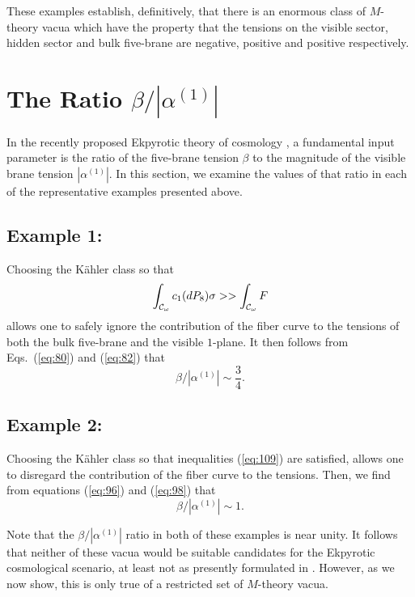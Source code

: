 \documentclass[a4paper,12pt]{article}
\numberwithin{equation}{section}
\theoremstyle{plain}
\begin{document}
These examples establish, definitively, that there is an enormous class of
$M$-theory vacua which have the property that the tensions on the visible
sector, hidden sector and bulk five-brane are negative, positive and positive
respectively.

\section{The Ratio $\beta/|\alpha^{(1)}|$}

In the recently proposed Ekpyrotic theory of cosmology 
\cite{EU}, a fundamental input
parameter is the ratio of the five-brane tension $\beta$ to the magnitude of
the visible brane tension $|\alpha^{(1)}|$. In this section, we examine the
values of that ratio in each of the representative examples presented above.

\subsection*{Example 1:}

Choosing the K\"{a}hler class so that 
%
\begin{equation}
\int_{{\cal{C}}_{\omega}}{c_{1}(dP_{8})\sigma} >>\int_{{\cal{C}}_{\omega}}{F}
\label{eq:125}
\end{equation}
%
allows one to safely ignore the contribution of the fiber curve to the
tensions of both the bulk five-brane and the visible $1$-plane. It then
follows from Eqs.~(\ref{eq:80}) and (\ref{eq:82}) that
%
\begin{equation}
\beta/|\alpha^{(1)}|\sim \frac{3}{4}.
\label{eq:126}
\end{equation}
%


\subsection*{Example 2:}

Choosing the K\"{a}hler class so that inequalities (\ref{eq:109}) are satisfied,
allows one to disregard the contribution of the fiber curve to the
tensions. Then, we find from equations (\ref{eq:96}) and (\ref{eq:98}) that
%
\begin{equation}
\beta/|\alpha^{(1)}|\sim 1.
\label{eq:128}
\end{equation}
%

Note that the $\beta/|\alpha^{(1)}|$ ratio in both of these examples is near
unity. It follows that neither of these vacua would be suitable candidates for
the Ekpyrotic cosmological scenario, at least not as presently formulated
in \cite{EU}. However, as we now show, this is only true of a restricted 
set of $M$-theory vacua.
\end{document}
